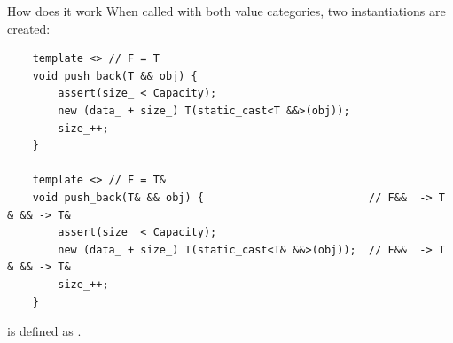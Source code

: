 \begin{frame}[fragile]{How does it work}
  When called with both value categories, two instantiations are created:
  \begin{verbatim}
    template <> // F = T
    void push_back(T && obj) {
        assert(size_ < Capacity);
        new (data_ + size_) T(static_cast<T &&>(obj));
        size_++;
    }

    template <> // F = T&
    void push_back(T& && obj) {                          // F&&  -> T & && -> T&
        assert(size_ < Capacity);
        new (data_ + size_) T(static_cast<T& &&>(obj));  // F&&  -> T & && -> T&
        size_++;
    }
  \end{verbatim}

  \begin{sqt:definition}
     is defined as .
  \end{sqt:definition}
\end{frame}






      




